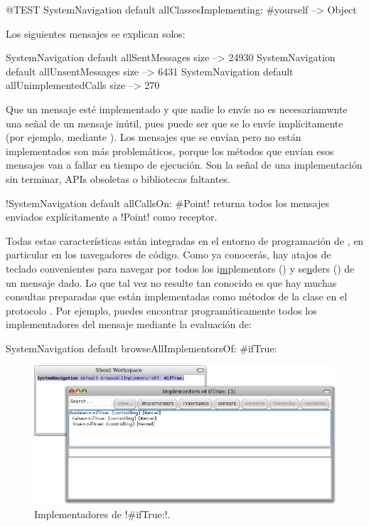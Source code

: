 \documentclass[a4paper,10pt,twoside]{book}
\begin{document}
\begin{code}{@TEST}
SystemNavigation default allClassesImplementing: #yourself --> {Object}
\end{code}

Los siguientes mensajes se explican solos:

\begin{code}{}
SystemNavigation default allSentMessages size          --> 24930
SystemNavigation default allUnsentMessages size      --> 6431
SystemNavigation default allUnimplementedCalls size --> 270
\end{code}

Que un mensaje esté implementado y que nadie lo envíe no es
necesariamwnte una señal de un mensaje inútil, pues puede ser que se
lo envíe implícitamente (por ejemplo, mediante ).  Los
mensajes que se envían pero no están implementados son más
problemáticos, porque los métodos que envían esos mensajes van a
fallar en tiempo de ejecución.  Son la señal de una implementación sin
terminar, APIs obsoletas o bibliotecas faltantes.

\ct!SystemNavigation default allCallsOn: #Point! returna todos los
mensajes enviados explícitamente a \ct!Point! como receptor.

Todas estas características están integradas en el entorno de
programación de \pharo, en particular en los navegadores de código.
Como ya conocerás, hay atajos de teclado convenientes para navegar por
todos los i\underline{m}plementors () y se\underline{n}ders
() de un mensaje dado.  Lo que tal vez no resulte tan
conocido es que hay muchas consultas preparadas que están
implementadas como métodos de la clase  en el
protocolo .  Por ejemplo, puedes encontrar
programáticamente todos los implementadores del mensaje 
mediante la evaluación de:
\begin{code}{}
SystemNavigation default browseAllImplementorsOf: #ifTrue:
\end{code}

\begin{figure}[ht]\centering
        \includegraphics[width=\linewidth]{implementors}
        \caption{Implementadores de \ct!\#ifTrue:!.}
\end{figure}
\end{document}
